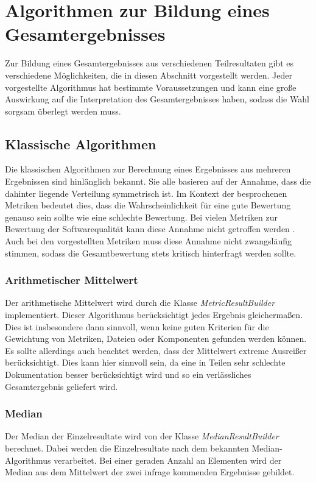  \section{Algorithmen zur Bildung eines Gesamtergebnisses}\label{chapter:algos_aggregation}
Zur Bildung eines Gesamtergebnisses aus verschiedenen Teilresultaten gibt es verschiedene Möglichkeiten, die in diesen Abschnitt vorgestellt werden. Jeder vorgestellte Algorithmus hat bestimmte Voraussetzungen und  kann eine große Auswirkung auf die Interpretation des Gesamtergebnisses haben, sodass die Wahl sorgsam überlegt werden muss. 

\subsection{Klassische Algorithmen}
Die klassischen Algorithmen zur Berechnung eines Ergebnisses aus mehreren Ergebnissen sind hinlänglich bekannt. Sie alle basieren auf der Annahme, dass die dahinter liegende Verteilung symmetrisch ist. Im Kontext der besprochenen Metriken bedeutet dies, dass die Wahrscheinlichkeit für eine gute Bewertung genauso sein sollte wie eine schlechte Bewertung. Bei vielen Metriken zur Bewertung der Softwarequalität kann diese Annahme nicht getroffen werden \cite[S.~313]{Youcantcontroltheunfamiliar:Astudyontherelationsbetweenaggregationtechniquesforsoftwaremetrics}. Auch bei den vorgestellten Metriken muss diese Annahme nicht zwangsläufig stimmen, sodass die Gesamtbewertung stets kritisch hinterfragt werden sollte. 
\subsubsection{Arithmetischer Mittelwert}
Der arithmetische Mittelwert wird durch die Klasse \textit{MetricResultBuilder} implementiert. Dieser Algorithmus berücksichtigt jedes Ergebnis gleichermaßen. Dies ist insbesondere dann sinnvoll, wenn keine guten Kriterien für die Gewichtung von Metriken, Dateien oder Komponenten gefunden werden können. Es sollte allerdings auch beachtet werden, dass der Mittelwert extreme Ausreißer berücksichtigt. Dies kann hier sinnvoll sein, da eine in Teilen sehr schlechte Dokumentation besser berücksichtigt wird und so ein verlässliches Gesamtergebnis geliefert wird.


\subsubsection{Median}
Der Median der Einzelresultate wird von der Klasse \textit{MedianResultBuilder} berechnet. Dabei werden die Einzelresultate nach dem bekannten Median-Algorithmus verarbeitet. Bei einer geraden Anzahl an Elementen wird der Median aus dem Mittelwert der zwei infrage kommenden Ergebnisse gebildet. 

